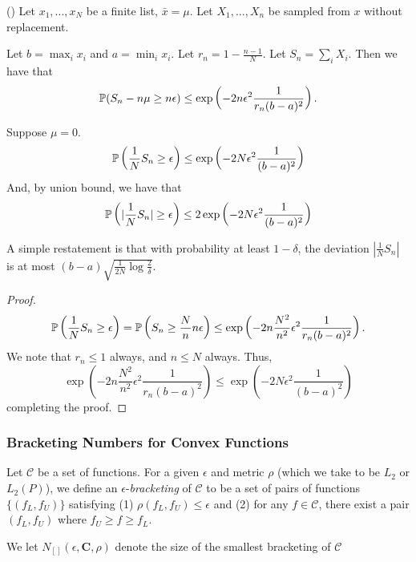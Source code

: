 \begin{lemma} (\cite{serfling1974probability}) 
Let $x_1,..., x_N$ be a finite list, $\bar{x} = \mu$. Let $X_1,...,X_n$ be sampled from $x$ without replacement. 

Let $b = \max_i x_i$ and $a = \min_i x_i$. Let $r_n = 1- \frac{n-1}{N}$. Let $S_n = \sum_i X_i$.
Then we have that
\[
\P( S_n - n \mu \geq n \epsilon) \leq \exp\left( - 2 n \epsilon^2 \frac{1}{r_n (b-a)^2}\right).
\]
\end{lemma}

\begin{corollary}
\label{cor:serfling}
Suppose $\mu = 0$. 
\[
\P\left( \frac{1}{N} S_n \geq \epsilon\right) \leq \exp\left( -2 N \epsilon^2 \frac{1}{(b-a)^2}\right)
\]
And, by union bound, we have that
\[
\P\left( | \frac{1}{N} S_n| \geq \epsilon\right) \leq 2 \exp\left( -2 N \epsilon^2 \frac{1}{(b-a)^2}\right)
\]

\end{corollary}

A simple restatement is that with probability at least $1- \delta$, the deviation $| \frac{1}{N} S_n|$ is at most $ (b-a) \sqrt{ \frac{1}{2N} \log \frac{2}{\delta}}$.

\begin{proof}
\[
\P\left( \frac{1}{N} S_n \geq \epsilon\right) = \P\left( S_n \geq \frac{N}{n} n \epsilon\right) \leq \exp\left( - 2 n \frac{N^2}{n^2} \epsilon^2 \frac{1}{r_n (b-a)^2} \right).
\]
We note that $r_n \leq 1$ always, and $n \leq N$ always.   Thus,
\[
\exp\left( - 2 n \frac{N^2}{n^2} \epsilon^2 \frac{1}{r_n (b-a)^2} \right)  \leq \exp\left( - 2 N \epsilon^2 \frac{1}{(b-a)^2}\right)
\]
completing the proof.
\end{proof}

\subsubsection{Bracketing Numbers for Convex Functions}

\begin{definition}
Let $\mathcal{C}$ be a set of functions. For a given $\epsilon$ and metric $\rho$ (which we take to be $L_2$ or $L_2(P)$), we define an $\epsilon$-\textit{bracketing} of $\mathcal{C}$ to be a set of pairs of functions $\{ (f_L, f_U) \}$ satisfying (1) $\rho( f_L, f_U) \leq \epsilon$ and (2) for any $f \in \mathcal{C}$, there exist a pair $(f_L, f_U)$ where $f_U \geq f \geq f_L$. 

We let $N_{[]}(\epsilon, \mathbf{C}, \rho)$ denote the size of the smallest bracketing of $\mathcal{C}$
\end{definition}

